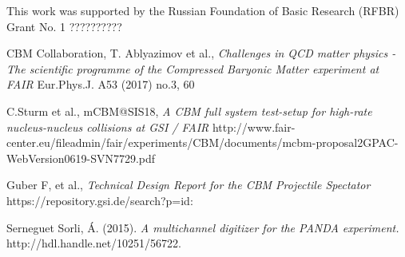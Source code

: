 \documentclass[a4paper,11pt]{article}
\begin{document}
\acknowledgments
This work was supported by the Russian Foundation of Basic Research (RFBR) Grant No. 1 ??????????



\begin{thebibliography}{99}


CBM Collaboration, T. Ablyazimov et al., \emph{Challenges in QCD matter physics -The scientific programme of the Compressed Baryonic Matter experiment at FAIR} Eur.Phys.J. A53 (2017) no.3, 60 


C.Sturm et al., mCBM@SIS18, \emph{A CBM full system test-setup for high-rate nucleus-nucleus collisions at GSI / FAIR} http://www.fair-center.eu/fileadmin/fair/experiments/CBM/documents/mcbm-proposal2GPAC-WebVersion0619-SVN7729.pdf

Guber F, et al., \emph{Technical Design Report for the CBM Projectile Spectator} https://repository.gsi.de/search?p=id:%

Serneguet Sorli, Á. (2015). \emph{A multichannel digitizer for the PANDA experiment.} http://hdl.handle.net/10251/56722.



\end{thebibliography}
\end{document}
